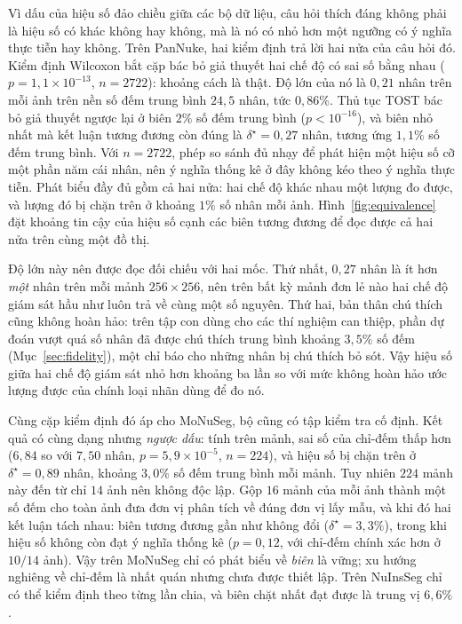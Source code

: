 \documentclass[preprint,12pt]{elsarticle}
\begin{document}
Vì dấu của hiệu số đảo chiều giữa các bộ dữ liệu, câu hỏi thích đáng không phải là hiệu số có khác không hay
không, mà là nó có nhỏ hơn một ngưỡng có ý nghĩa thực tiễn hay không. Trên PanNuke, hai kiểm định trả lời hai nửa
của câu hỏi đó. Kiểm định Wilcoxon bắt cặp bác bỏ giả thuyết hai chế độ có sai số bằng nhau
($p = 1{,}1 \times 10^{-13}$, $n = 2722$): khoảng cách là thật. Độ lớn của nó là $0{,}21$ nhân trên mỗi ảnh trên
nền số đếm trung bình $24{,}5$ nhân, tức $0{,}86\%$. Thủ tục TOST bác bỏ giả thuyết ngược lại ở biên $2\%$ số đếm
trung bình ($p < 10^{-16}$), và biên nhỏ nhất mà kết luận tương đương còn đúng là $\delta^\star = 0{,}27$ nhân,
tương ứng $1{,}1\%$ số đếm trung bình. Với $n = 2722$, phép so sánh đủ nhạy để phát hiện một hiệu số cỡ một phần
năm cái nhân, nên ý nghĩa thống kê ở đây không kéo theo ý nghĩa thực tiễn. Phát biểu đầy đủ gồm cả hai nửa: hai
chế độ khác nhau một lượng đo được, và lượng đó bị chặn trên ở khoảng $1\%$ số nhân mỗi ảnh.
Hình~\ref{fig:equivalence} đặt khoảng tin cậy của hiệu số cạnh các biên tương đương để đọc được cả hai nửa trên
cùng một đồ thị.

Độ lớn này nên được đọc đối chiếu với hai mốc. Thứ nhất, $0{,}27$ nhân là ít hơn \emph{một} nhân trên mỗi mảnh
$256\times256$, nên trên bất kỳ mảnh đơn lẻ nào hai chế độ giám sát hầu như luôn trả về cùng một số nguyên. Thứ
hai, bản thân chú thích cũng không hoàn hảo: trên tập con dùng cho các thí nghiệm can thiệp, phần dự đoán vượt quá
số nhân đã được chú thích trung bình khoảng $3{,}5\%$ số đếm (Mục~\ref{sec:fidelity}), một chỉ báo cho những nhân
bị chú thích bỏ sót. Vậy hiệu số giữa hai chế độ giám sát nhỏ hơn khoảng ba lần so với mức không hoàn hảo ước
lượng được của chính loại nhãn dùng để đo nó.

Cùng cặp kiểm định đó áp cho MoNuSeg, bộ cũng có tập kiểm tra cố định. Kết quả có cùng dạng nhưng \emph{ngược
dấu}: tính trên mảnh, sai số của chỉ-đếm thấp hơn ($6{,}84$ so với $7{,}50$ nhân, $p = 5{,}9 \times 10^{-5}$,
$n = 224$), và hiệu số bị chặn trên ở $\delta^\star = 0{,}89$ nhân, khoảng $3{,}0\%$ số đếm trung bình mỗi mảnh.
Tuy nhiên $224$ mảnh này đến từ chỉ $14$ ảnh nên không độc lập. Gộp $16$ mảnh của mỗi ảnh thành một số đếm cho
toàn ảnh đưa đơn vị phân tích về đúng đơn vị lấy mẫu, và khi đó hai kết luận tách nhau: biên tương đương gần như
không đổi ($\delta^\star = 3{,}3\%$), trong khi hiệu số không còn đạt ý nghĩa thống kê ($p = 0{,}12$, với chỉ-đếm
chính xác hơn ở $10/14$ ảnh). Vậy trên MoNuSeg chỉ có phát biểu về \emph{biên} là vững; xu hướng nghiêng về
chỉ-đếm là nhất quán nhưng chưa được thiết lập. Trên NuInsSeg chỉ có thể kiểm định theo từng lần chia, và biên
chặt nhất đạt được là trung vị $6{,}6\%$.
\end{document}
